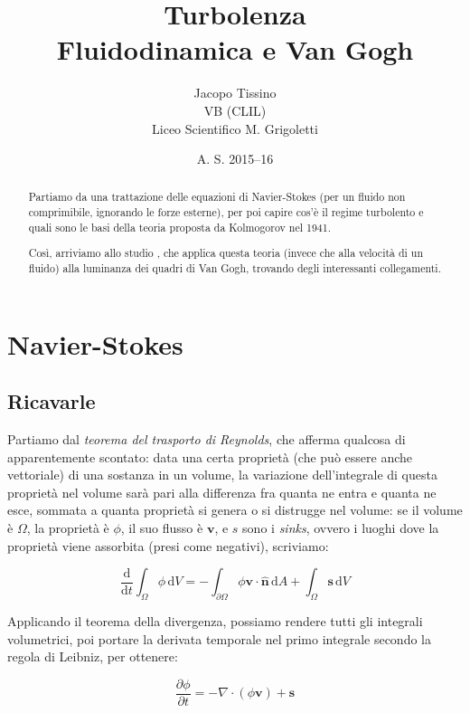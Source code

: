 \documentclass[12pt,a4paper]{article}
\author{Jacopo Tissino \\
VB
(CLIL)\\
Liceo Scientifico M. Grigoletti}
\date{A. S. 2015--16}
\title{\huge{\textbf{Turbolenza}}\\
\Large{Fluidodinamica e Van Gogh}}
\numberwithin{equation}{section}
\begin{document}
\maketitle

\begin{abstract}
Partiamo da una trattazione delle equazioni di Navier-Stokes (per un fluido non comprimibile, ignorando le forze esterne), per poi capire cos'è il regime turbolento e quali sono le basi della teoria proposta da Kolmogorov nel 1941.

Così, arriviamo allo studio \cite{study2006}, che applica questa teoria (invece che alla velocità di un fluido) alla luminanza dei quadri di Van Gogh, trovando degli interessanti collegamenti.
\end{abstract}

\section{Navier-Stokes}

\subsection{Ricavarle}

Partiamo \cite{derivationns} dal \emph{teorema del trasporto di Reynolds}, che afferma qualcosa di apparentemente scontato: data una certa proprietà (che può essere anche vettoriale) di una sostanza in un volume, la variazione dell'integrale di questa proprietà nel volume sarà pari alla differenza fra quanta ne entra e quanta ne esce, sommata a quanta proprietà si genera o si distrugge nel volume: se il volume è $\Omega$, la proprietà è $\phi$, il suo flusso è $\mathbf{v}$, e $s$ sono i \emph{sinks}, ovvero i luoghi dove la proprietà viene assorbita (presi come negativi), scriviamo:

\begin{equation}
\frac{\text{d}}{\text{d} t} \int_{\Omega} \phi \, \text{d} V = -
\int_{\partial \Omega} \phi \mathbf{v} \cdot \mathbf{\hat{n}} \, \text{d} A +
\int_{\Omega} \mathbf{s} \, \text{d} V
\end{equation}

Applicando il teorema della divergenza, possiamo rendere tutti gli integrali volumetrici, poi portare la derivata temporale nel primo integrale secondo la regola di Leibniz, per ottenere:

\begin{equation}
\frac{\partial \phi}{\partial t} = - \nabla \cdot ( \phi \mathbf{v} ) + \mathbf{s}
\end{equation}
\end{document}
